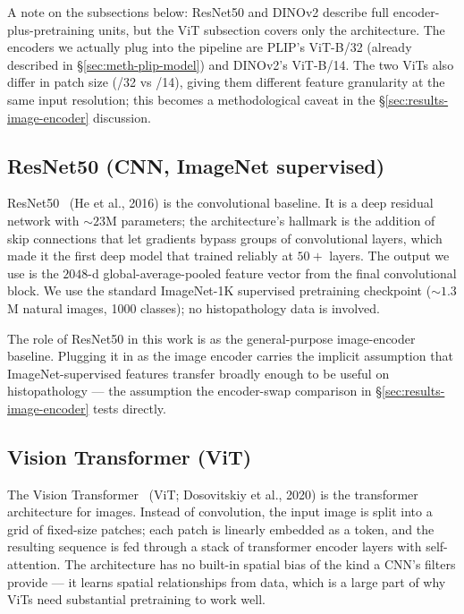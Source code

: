 A note on the subsections below: ResNet50 and DINOv2 describe full encoder-plus-pretraining units, but the ViT subsection covers only the architecture. The encoders we actually plug into the pipeline are PLIP's ViT-B/32 (already described in §\ref{sec:meth-plip-model}) and DINOv2's ViT-B/14. The two ViTs also differ in patch size (/32 vs /14), giving them different feature granularity at the same input resolution; this becomes a methodological caveat in the §\ref{sec:results-image-encoder} discussion.

\subsection{ResNet50 (CNN, ImageNet supervised)}
\label{sec:meth-image-resnet}

ResNet50~\cite{he2016resnet} (He et al., 2016) is the convolutional baseline. It is a deep residual network with $\sim 23$M parameters; the architecture's hallmark is the addition of skip connections that let gradients bypass groups of convolutional layers, which made it the first deep model that trained reliably at $50+$ layers. The output we use is the $2048$-d global-average-pooled feature vector from the final convolutional block. We use the standard ImageNet-1K supervised pretraining checkpoint ($\sim 1.3$M natural images, 1000 classes); no histopathology data is involved.

The role of ResNet50 in this work is as the general-purpose image-encoder baseline. Plugging it in as the image encoder carries the implicit assumption that ImageNet-supervised features transfer broadly enough to be useful on histopathology --- the assumption the encoder-swap comparison in §\ref{sec:results-image-encoder} tests directly.

\subsection{Vision Transformer (ViT)}
\label{sec:meth-image-vit}

The Vision Transformer~\cite{dosovitskiy2021vit} (ViT; Dosovitskiy et al., 2020) is the transformer architecture for images. Instead of convolution, the input image is split into a grid of fixed-size patches; each patch is linearly embedded as a token, and the resulting sequence is fed through a stack of transformer encoder layers with self-attention. The architecture has no built-in spatial bias of the kind a CNN's filters provide --- it learns spatial relationships from data, which is a large part of why ViTs need substantial pretraining to work well.

